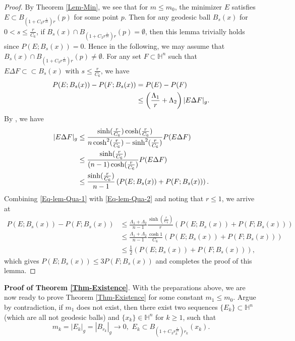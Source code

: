 \documentclass[11pt,reqno]{amsart}
\theoremstyle{definition}
\theoremstyle{remark}
\numberwithin{equation}{section}
\renewcommand{\(}{\left(}
\renewcommand{\)}{\right)}
\renewcommand{\-}{\overline}
\begin{document}
\begin{proof}
	By Theorem \ref{Lem-Min}, we see that for $m\leq m_0$, the minimizer $E$ satisfies $E\subset B_{(1+C_3 r^{\frac{1}{2n}})r}(p)$ for some point $p$. Then for any geodesic ball $B_s(x)$ for $0<s\leq \frac{r}{C_6}$, if $B_s(x)\cap B_{(1+C_3 r^{\frac{1}{2n}})r}(p)=\emptyset$, then this lemma trivially holds since $P(E;B_s(x))=0$. Hence in the following, we may assume that $B_s(x)\cap B_{(1+C_3 r^{\frac{1}{2n}})r}(p)\neq\emptyset$. For any set $F\subset\mathbb{H}^n$ such that $E\Delta F\subset\subset B_s(x)$ with $s\leq\frac{r}{C_6}$, we have
	\begin{align}
		P(E;B_s(x))-P(F;B_s(x))&=P(E)-P(F)\notag\\
		&\leq\left(\frac{\Lambda_1}{r}+\Lambda_2\right)|E\Delta F|_g.\label{Eq-lem-Qua-1}
	\end{align}
By \cite[Lemma 2.2]{Bogelein15}, we have
\begin{align}
	|E\Delta F|_g&\leq\frac{\sinh(\frac{r}{C_6})\cosh(\frac{r}{C_6})}{n\cosh^2(\frac{r}{C_6})-\sinh^2(\frac{r}{C_6})}P(E\Delta F)\notag\\
	&\leq\frac{\sinh(\frac{r}{C_6})}{(n-1)\cosh(\frac{r}{C_6})}P(E\Delta F)\notag\\
	&\leq \frac{\sinh(\frac{r}{C_6})}{n-1}\left(P(E;B_s(x))+P(F;B_s(x))\right).\label{Eq-lem-Qua-2}
\end{align}
Combining \eqref{Eq-lem-Qua-1} with \eqref{Eq-lem-Qua-2} and noting that $r\leq 1$, we arrive at
\begin{align*}
	P(E;B_s(x))-P(F;B_s(x))&\leq \frac{\Lambda_1+\Lambda_2}{n-1}\frac{\sinh(\frac{r}{C_6})}{r}\left(P(E;B_s(x))+P(F;B_s(x))\right)\\
	&\leq \frac{\Lambda_1+\Lambda_2}{n-1}\frac{\cosh 1}{C_6}\left(P(E;B_s(x))+P(F;B_s(x))\right)\\
	&\leq \frac{1}{2}\left(P(E;B_s(x))+P(F;B_s(x))\right),
\end{align*}
which gives $P(E;B_s(x))\leq 3 P(F;B_s(x))$ and completes the proof of this lemma.
\end{proof}
 {\bf{Proof of Theorem \ref{Thm-Existence}}}. With the preparations above, we are now ready to prove Theorem  \ref{Thm-Existence} for some constant $m_1\leq m_0$. Argue by contradiction, if $m_1$ does not exist, then there exist two sequences $\{E_k\}\subset\mathbb{H}^n$ (which are all not geodesic balls) and $\{x_k\}\in\mathbb{H}^n$ for $k\geq 1$, such that
 \begin{equation}
  m_k=|E_k|_g=|B_{r_k}|_g\to 0,\,\, E_k\subset B_{(1+C_3 r_k^{\frac{1}{2n}})r_k}(x_k).
 \end{equation}
\end{document}
